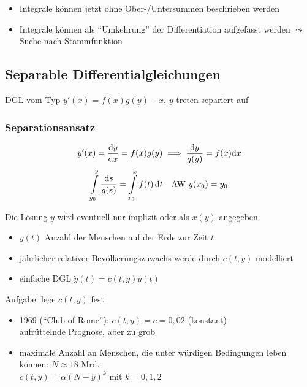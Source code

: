 \begin{note}
  \begin{itemize}
    \item Integrale können jetzt ohne Ober-/Untersummen beschrieben werden
    \item Integrale können als "`Umkehrung"' der Differentiation aufgefasst werden $\leadsto$ Suche nach Stammfunktion
  \end{itemize}
\end{note}

\subsection{Separable Differentialgleichungen}

DGL vom Typ $y'(x) = f(x)g(y)$ -- $x$, $y$ treten separiert auf

\subsubsection*{Separationsansatz}

\[ y'(x) = \frac{\mathrm d y}{\mathrm d x} = f(x) g(y) \implies \frac{\mathrm d y}{g(y)} = f(x)\mathrm d x\]
\[ \int\limits_{y_0}^y \frac{\mathrm d s}{g(s)} = \int\limits_{x_0}^{x} f(t)\,\mathrm d t \quad\text{AW } y(x_0) = y_0 \]

\begin{note}
  Die Lösung $y$ wird eventuell nur implizit oder als $x(y)$ angegeben.
\end{note}

\begin{example}
  \begin{itemize}
    \item $y(t)$ Anzahl der Menschen auf der Erde zur Zeit $t$
    \item jährlicher relativer Bevölkerungszuwachs werde durch $c(t,y)$ modelliert
    \item einfache DGL $\dot y(t) = c(t,y)y(t)$
  \end{itemize}
  Aufgabe: lege $c(t,y)$ fest
  \begin{itemize}
    \item 1969 ("`Club of Rome"'): $c(t,y) = c = 0,02$ (konstant)\\
      aufrüttelnde Prognose, aber zu grob
    \item maximale Anzahl an Menschen, die unter würdigen Bedingungen leben können: $N \approx 18 \text{ Mrd.}$\\
      $c(t,y) = \alpha (N-y)^k$ mit $k = 0, 1, 2$
  \end{itemize}

\end{example}

